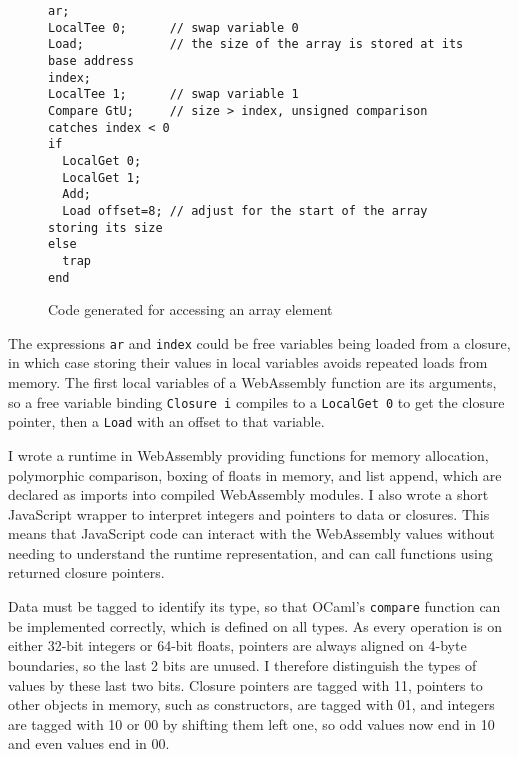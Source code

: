 \begin{figure}[H]
\begin{verbatim}
ar; 
LocalTee 0;      // swap variable 0
Load;            // the size of the array is stored at its base address
index; 
LocalTee 1;      // swap variable 1
Compare GtU;     // size > index, unsigned comparison catches index < 0
if
  LocalGet 0;
  LocalGet 1;
  Add;
  Load offset=8; // adjust for the start of the array storing its size
else
  trap 
end
\end{verbatim}
\caption{Code generated for accessing an array element}
\end{figure}

The expressions \verb|ar| and \verb|index| could be free variables being loaded from a closure, in which case storing their values in local variables avoids repeated loads from memory. 
The first local variables of a WebAssembly function are its arguments, so a free variable binding \verb|Closure i| compiles to a  \verb|LocalGet 0| to get the closure pointer, then a \verb|Load| with an offset to that variable.



I wrote a runtime in WebAssembly providing functions for memory allocation, polymorphic comparison, boxing of floats in memory, and list append, which are declared as imports into compiled WebAssembly modules. %
I also wrote a short JavaScript wrapper to interpret integers and pointers to data or closures. This means that JavaScript code can interact with the WebAssembly values without needing to understand the runtime representation, and can call functions using returned closure pointers.

Data must be tagged to identify its type, so that OCaml's \verb|compare| function can be implemented correctly, which is defined on all types. As every operation is on either 32-bit integers or 64-bit floats, pointers are always aligned on 4-byte boundaries, so the last 2 bits are unused. I therefore distinguish the types of values by these last two bits. Closure pointers are tagged with 11, pointers to other objects in memory, such as constructors, are tagged with 01, and integers are tagged with 10 or 00 by shifting them left one, so odd values now end in 10 and even values end in 00. 

